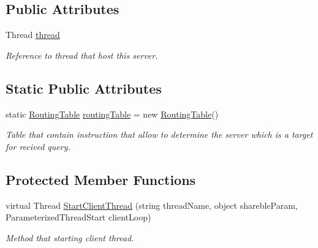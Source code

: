 \subsection*{Public Attributes}
\begin{DoxyCompactItemize}
\item 
Thread \mbox{\hyperlink{class_uniform_client_1_1_base_client_a458271823ca5e21612c0947e1db695a0}{thread}}
\begin{DoxyCompactList}\small\item\em Reference to thread that host this server. \end{DoxyCompactList}\end{DoxyCompactItemize}
\subsection*{Static Public Attributes}
\begin{DoxyCompactItemize}
\item 
static \mbox{\hyperlink{class_pipes_provider_1_1_networking_1_1_routing_1_1_routing_table}{Routing\+Table}} \mbox{\hyperlink{class_uniform_client_1_1_base_client_a33b34ea9a2d7b4b8e26af767ab2897cf}{routing\+Table}} = new \mbox{\hyperlink{class_pipes_provider_1_1_networking_1_1_routing_1_1_routing_table}{Routing\+Table}}()
\begin{DoxyCompactList}\small\item\em Table that contain instruction that allow to determine the server which is a target for recived query. \end{DoxyCompactList}\end{DoxyCompactItemize}
\subsection*{Protected Member Functions}
\begin{DoxyCompactItemize}
\item 
virtual Thread \mbox{\hyperlink{class_uniform_client_1_1_base_client_a194b46bb0e889d07cade81c0aeab7cea}{Start\+Client\+Thread}} (string thread\+Name, object shareble\+Param, Parameterized\+Thread\+Start client\+Loop)
\begin{DoxyCompactList}\small\item\em Method that starting client thread. \end{DoxyCompactList}\end{DoxyCompactItemize}

